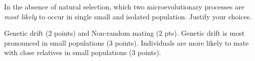 \question[10]
In the absence of natural selection, which two microevolutionary processes are \emph{most likely} to occur in single small and isolated population. Justify your choices.




\begin{solution}
Genetic drift (2 points) and Non-random mating (2 pts).  Genetic drift is most pronounced in small populations (3 points). Individuals are more likely to mate with close relatives in small populations (3 points).
\end{solution}
